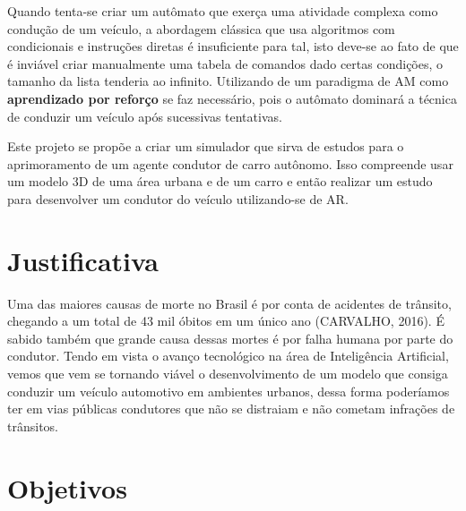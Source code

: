 Quando tenta-se criar um autômato que exerça uma atividade complexa como condução de um veículo, a abordagem clássica que usa algoritmos com condicionais e instruções diretas é insuficiente para tal, isto deve-se ao fato de que é inviável criar manualmente uma tabela de comandos dado certas condições, o tamanho da lista tenderia ao infinito. Utilizando de um paradigma de AM como \textbf{aprendizado por reforço} se faz necessário, pois o autômato dominará a técnica de conduzir um veículo após sucessivas tentativas.

Este projeto se propõe a criar um simulador que sirva de estudos para o aprimoramento de um agente condutor de carro autônomo. Isso compreende usar um modelo 3D de uma área urbana e de um carro e então realizar um estudo para desenvolver um condutor do veículo utilizando-se de AR. 



\section*{Justificativa}\label{sec:justificativa}
Uma das maiores causas de morte no Brasil é por conta de acidentes de trânsito, chegando a um total de 43 mil óbitos em um único ano (CARVALHO, 2016). É sabido também que grande causa dessas mortes é por falha humana por parte do condutor. Tendo em vista o avanço tecnológico na área de Inteligência Artificial, vemos que vem se tornando viável o desenvolvimento de um modelo que consiga conduzir um veículo automotivo em ambientes urbanos, dessa forma poderíamos ter em vias públicas condutores que não se distraiam e não cometam infrações de trânsitos.


\section*{Objetivos}\label{sec:objetivos}
